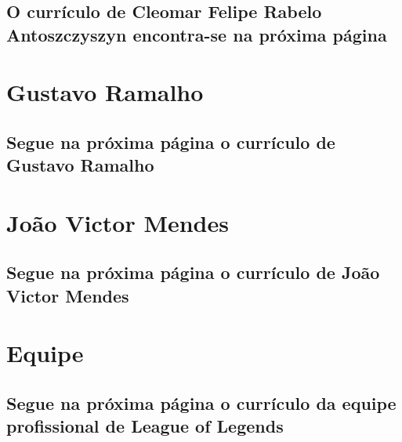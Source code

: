 \documentclass[oneside]{book}
\begin{document}
	\section*{O currículo de Cleomar Felipe Rabelo Antoszczyszyn encontra-se na próxima página}
	\restoregeometry
	\newpage
	
	{\selectfont
		
		\chapter{Gustavo Ramalho}
		\section*{Segue na próxima página o currículo de Gustavo Ramalho}
		\newpage
		
		
		\chapter{João Victor Mendes}
		\section*{Segue na próxima página o currículo de João Victor Mendes}
		\newpage
		
		
		\chapter{Equipe}
		\section*{Segue na próxima página o currículo da equipe profissional de League of Legends\cite{prabhu}}
		\newpage
		
		
		
		
	}
\end{document}

